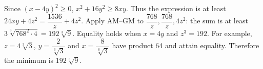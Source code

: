 Since $(x-4y)^2\ge0$, $x^2+16y^2\ge8xy$. Thus the expression is at least $24xy+4z^2=\dfrac{1536}{z}+4z^2$. Apply AM--GM to $\dfrac{768}{z},\dfrac{768}{z},4z^2$: the sum is at least $3\sqrt[3]{768^2\cdot4}=192\sqrt[3]9$. Equality holds when $x=4y$ and $z^3=192$. For example, $z=4\sqrt[3]3$, $y=\dfrac{2}{\sqrt[6]3}$ and $x=\dfrac{8}{\sqrt[6]3}$ have product 64 and attain equality. Therefore the minimum is $\boxed{192\sqrt[3]9}$.
